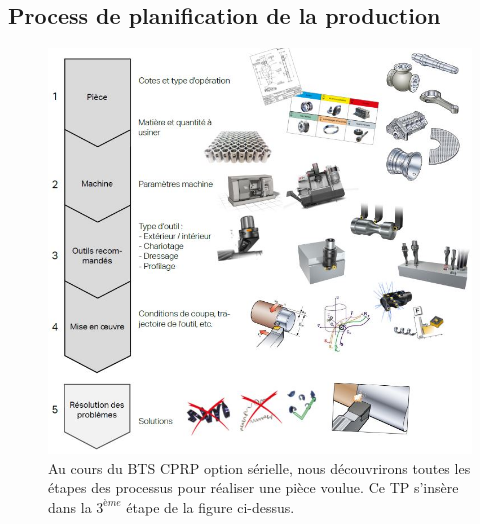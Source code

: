 \documentclass[12pt]{article}
\begin{document}
\subsection{Process de planification de la production}
\begin{figure}[h]
\centering
\includegraphics[width=0.93\linewidth]{Images/P1.JPG}
\caption{Au cours du BTS CPRP option sérielle, nous découvrirons toutes les étapes des processus pour réaliser une pièce voulue. Ce TP s'insère dans la $3^{ème}$ étape de la figure ci-dessus.}
\label{P1}
\end{figure}


\newpage
\end{document}
